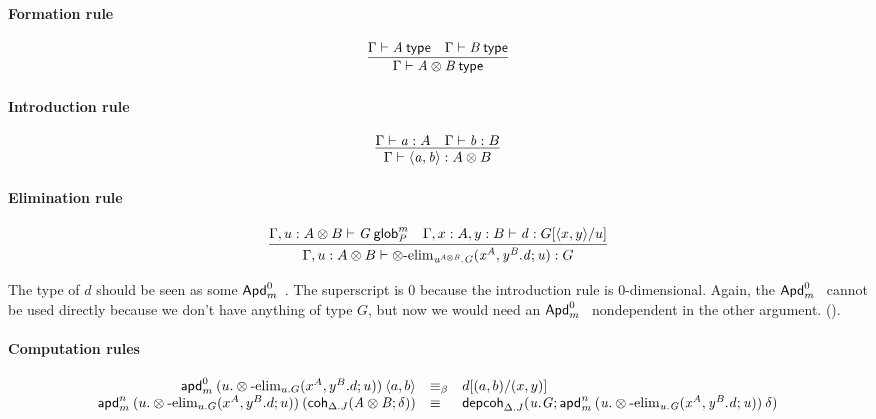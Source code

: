 \paragraph{Formation rule}

\begin{small}
  \[
  \infer{\wftype\Gamma{A\otimes B}} {\wftype\Gamma{A} & \wftype\Gamma{B}}
  \]
\end{small}

\paragraph{Introduction rule}

\begin{small}
  \[
  \infer{\ofglob{\Gamma}{\langle a, b\rangle}{A\otimes B}}
  {\ofglob{\Gamma}{a}{A}
    & \ofglob{\Gamma}{b}{B}}
  \]
\end{small}

\paragraph{Elimination rule}

\begin{small}
  \[
  \infer{\ofglob{\Gamma,u:A\otimes B}{\otimes\text{-elim}_{u^{A\otimes B}.G}
      {(x^A,y^B.d;u)}}{G}}
  {\wfglob{\Gamma,u:A\otimes B}{G}{m}{P}
    & \ofglob{\Gamma,x:A,y:B}{d}{G[\langle x,y\rangle/u]}}
  \]
\end{small}

The type of $d$ should be seen as some $\mathsf{Apd}^{0}_{m} \: {} \: {}$. The superscript is
$0$ because the introduction rule is $0$-dimensional. Again, the
$\mathsf{Apd}^{0}_{m} \: {} \: {}$ cannot be used directly because we don’t have anything of
type $G$, but now we would need an $\mathsf{Apd}^{0}_{m} \: {} \: {}$ nondependent in the other
argument. ().

\paragraph{Computation rules}

\begin{small}
  \[
  \begin{array}{rll}
    \mathsf{apd}^{0}_{m} \: {(u.\otimes\text{-elim}_{u.G}
      {(x^A,y^B.d;u)})} \: {\langle a,b\rangle} & \equiv_\beta & d[(a,b)/(x,y)] \\
    \mathsf{apd}^{n}_{m} \: {(u.\otimes\text{-elim}_{u.G}
      {(x^A,y^B.d;u)})} \: {(\mathsf{coh}_{\Delta.J} \mathit{(A\otimes B;\delta)})} & \equiv &
    \mathsf{depcoh}_{\Delta.J} \mathit{(u.G;\mathsf{apd}^{n}_{m} \: {(u.\otimes\text{-elim}_{u.G}
      {(x^A,y^B.d;u)})} \: {\delta})}
  \end{array}
  \]
\end{small}


